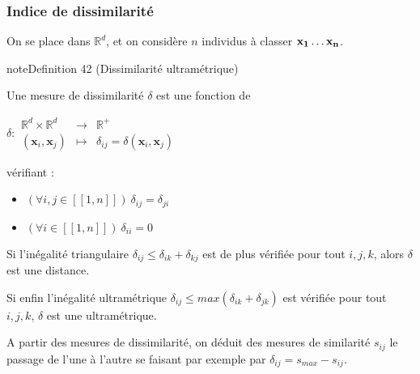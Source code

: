\documentclass[letterpaper,10pt,english]{jupyterBook}
\begin{document}
\subsubsection{Indice de dissimilarité}
\label{\detokenize{clustering:indice-de-dissimilarite}}
\sphinxAtStartPar
On se place dans \(\mathbb R^d\), et on considère \(n\) individus à classer \({\bf x_1}\ldots {\bf x_n}\).
\label{clustering:definition-2}
\begin{sphinxadmonition}{note}{Definition 42 (Dissimilarité \sphinxhyphen{} ultramétrique)}



\sphinxAtStartPar
Une mesure de dissimilarité \(\delta\) est une fonction de

\sphinxAtStartPar
\(
 \delta: \begin{array}{ccc}
\mathbb{R}^d\times\mathbb{R}^d &\rightarrow &\mathbb{R}^+\\
(\mathbf x_i,\mathbf x_j)&\mapsto & \delta_{ij} = \delta(\mathbf x_i,\mathbf x_j)
\end{array}
\)

\sphinxAtStartPar
vérifiant :
\begin{itemize}
\item {} 
\sphinxAtStartPar
\((\forall i,j\in[\![1, n]\!])\ \delta_{ij}=\delta_{ji}\)

\item {} 
\sphinxAtStartPar
\((\forall i\in[\![1, n]\!])\ \delta_{ii}= 0\)

\end{itemize}

\sphinxAtStartPar
Si l’inégalité triangulaire \(\delta_{ij}\leq \delta_{ik}+\delta_{kj}\) est de plus vérifiée pour tout \(i,j,k\), alors \(\delta\) est une distance.

\sphinxAtStartPar
Si enfin l’inégalité ultramétrique  \(\delta_{ij}\leq max(\delta_{ik}+\delta_{jk})\) est  vérifiée pour tout \(i,j,k\), \(\delta\) est une ultramétrique.
\end{sphinxadmonition}

\sphinxAtStartPar
A partir des mesures de dissimilarité, on déduit des mesures de similarité \(s_{ij}\) le passage de l’une à l’autre se faisant par exemple par \(\delta_{ij} = s_{max}-s_{ij}\).
\end{document}

